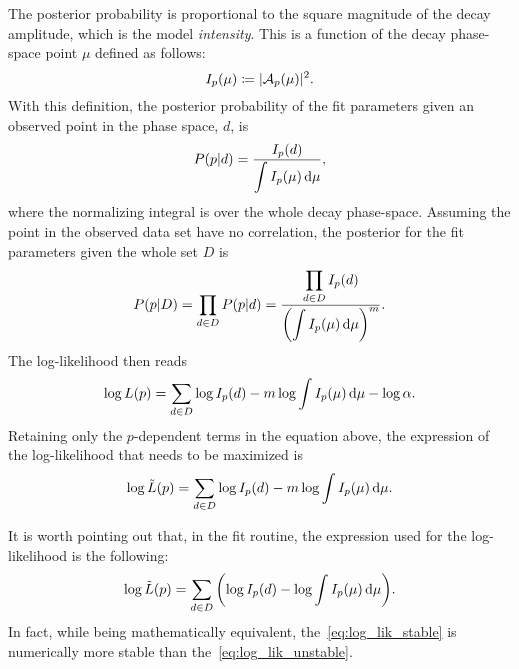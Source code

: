     The posterior probability is proportional to the square magnitude of the decay amplitude, which is the model \emph{intensity}.
    This is a function of the decay phase-space point $\mu$ defined as follows:
    \begin{equation}
        I_p(\mu) \coloneqq \lvert\mathcal{A}_p(\mu)\rvert^2.
    \end{equation}
    With this definition, the posterior probability of the fit parameters given an observed point in the phase space, $d$, is
    \begin{equation}
        P(p\vert d) = \frac{I_p(d)}{\displaystyle\int I_p(\mu)\mathop{}\!\textup{d}\mu},
    \end{equation}
    where the normalizing integral is over the whole decay phase-space.
    Assuming the point in the observed data set have no correlation, the posterior for the fit parameters given the whole set $D$ is
    \begin{equation}
        P(p\vert D) = \prod_{d\in D} P(p\vert d) = \frac{\displaystyle\prod_{d\in D}I_p(d)}{\displaystyle\left(\int I_p(\mu)\mathop{}\!\textup{d}\mu\right)^m}.
    \end{equation}
    The log-likelihood then reads
    \begin{equation}
        \log L(p) = \sum_{d\in D}\log I_p(d) - m\log\int I_p(\mu) \mathop{}\!\textup{d} \mu - \log \alpha.
    \end{equation}
    Retaining only the $p$-dependent terms in the equation above, the expression of the log-likelihood that needs to be maximized is
    \begin{equation}\label{eq:log_lik_unstable}
        \log \tilde L(p) = \sum_{d\in D}\log I_p(d) - m\log \int I_p(\mu)\mathop{}\!\textup{d}\mu.
    \end{equation}


    It is worth pointing out that, in the fit routine, the expression used for the log-likelihood is the following:
    \begin{equation}\label{eq:log_lik_stable}
        \log \tilde L(p) = \sum_{d\in D}\left(\log I_p(d) - \log \int I_p(\mu)\mathop{}\!\textup{d}\mu\right)\!.
    \end{equation}
    In fact, while being mathematically equivalent, the~\eqref{eq:log_lik_stable} is numerically more stable than the~\eqref{eq:log_lik_unstable}.
